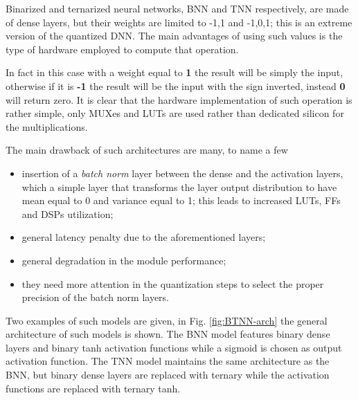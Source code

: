 \documentclass[../../main.tex]{subfiles}
\begin{document}
Binarized and ternarized neural networks, BNN and TNN respectively, are made of dense layers, but their weights are limited to {-1,1} and {-1,0,1}; this is an extreme version of the quantized DNN. The main advantages of using such values is the type of hardware employed to compute that operation.  

In fact in this case with a weight equal to \textbf{1} the result will be simply the input, otherwise if it is \textbf{-1} the result will be the input with the sign inverted, instead \textbf{0} will return zero. It is clear that the hardware implementation of such operation is rather simple, only MUXes and LUTs are used rather than dedicated silicon for the multiplications.  


The main drawback of such architectures are many, to name a few
\begin{itemize}
    \item insertion of a \textit{batch norm} layer between the dense and the activation layers, which a simple layer that transforms the layer output distribution to have mean equal to 0 and variance equal to 1; this leads to increased LUTs, FFs  and DSPs utilization;
    \item general latency penalty due to the aforementioned layers;
    \item general degradation in the module performance;
    \item they need more attention in the quantization steps to select the proper precision of the batch norm layers.
\end{itemize}
  
Two examples of such models are given, in Fig. \ref{fig:BTNN-arch} the general architecture of such models is shown. The BNN model features binary dense layers and binary tanh activation functions while a sigmoid is chosen as output activation function. The TNN model maintains the same architecture as the BNN, but binary dense layers are replaced with ternary while the activation functions are replaced with ternary tanh. 
\end{document}

